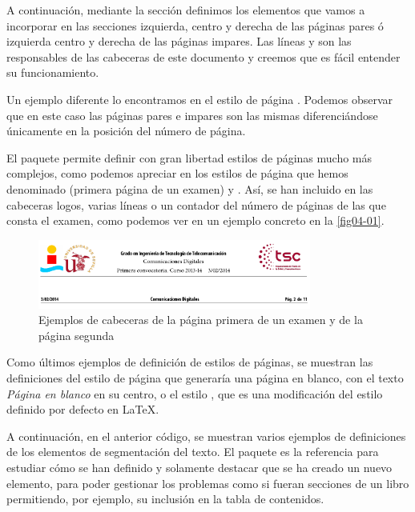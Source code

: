A continuación, mediante la sección  definimos los elementos que vamos a incorporar en las secciones izquierda, centro y derecha de las páginas pares ó izquierda centro y derecha de las páginas impares. Las líneas  y  son las responsables de las cabeceras de este documento y creemos que es fácil entender su funcionamiento.

Un ejemplo diferente lo encontramos en el estilo de página . Podemos observar que en este caso las páginas pares e impares son las mismas diferenciándose únicamente en la posición del número de página.

El paquete permite definir con gran libertad estilos de páginas mucho más complejos, como podemos apreciar en los estilos de página que hemos denominado  (primera página de un examen) y . Así, se han incluido en las cabeceras logos, varias líneas o un contador del número de páginas de las que consta el examen, como podemos ver en un ejemplo concreto en la  \autoref{fig04-01}.

\begin{figure}[htpb]
\centering 
\includegraphics[width=0.8\textwidth]{figuras/cabeceras.pdf}
\caption{Ejemplos de cabeceras de la página primera de un examen y de la página segunda}\label{fig04-01}%
\end{figure} 

Como últimos ejemplos de definición de estilos de páginas, se muestran las definiciones del estilo de página  que generaría una página en blanco, con el texto \emph{Página en blanco} en su centro, o el estilo , que es una modificación del estilo definido por defecto en \LaTeX.

A continuación, en el anterior código, se muestran varios ejemplos de definiciones de los elementos de segmentación del texto. El paquete  es la referencia para estudiar cómo se han definido y solamente destacar que se ha creado un nuevo elemento,  para poder gestionar los problemas como si fueran secciones de un libro permitiendo, por ejemplo, su inclusión en la tabla de contenidos. 

